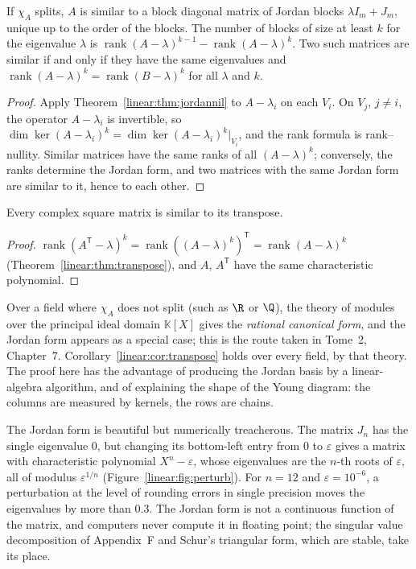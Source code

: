 \begin{corollary}\label{linear:cor:jordan}
If $\chi_A$ splits, $A$ is similar to a block diagonal matrix of Jordan blocks $\lambda I_m+J_m$, unique up to the order of
the blocks. The number of blocks of size at least $k$ for the eigenvalue $\lambda$ is
$\operatorname{rank}(A-\lambda)^{k-1}-\operatorname{rank}(A-\lambda)^k$. Two such matrices are similar if and only if
they have the same eigenvalues and $\operatorname{rank}(A-\lambda)^k=\operatorname{rank}(B-\lambda)^k$ for all $\lambda$ and $k$.
\end{corollary}
\begin{proof}
Apply Theorem~\ref{linear:thm:jordannil} to $A-\lambda_i$ on each $V_i$. On $V_j$, $j\ne i$, the operator $A-\lambda_i$ is invertible, so
$\dim\ker(A-\lambda_i)^k=\dim\ker(A-\lambda_i)^k|_{V_i}$, and the rank formula is rank--nullity. Similar matrices have the same
ranks of all $(A-\lambda)^k$; conversely, the ranks determine the Jordan form, and two matrices with the same Jordan form
are similar to it, hence to each other.
\end{proof}

\begin{corollary}\label{linear:cor:transpose}
Every complex square matrix is similar to its transpose.
\end{corollary}
\begin{proof}
$\operatorname{rank}(A^{\mathsf T}-\lambda)^k=\operatorname{rank}((A-\lambda)^k)^{\mathsf T}=\operatorname{rank}(A-\lambda)^k$
(Theorem~\ref{linear:thm:transpose}), and $A$, $A^{\mathsf T}$ have the same characteristic polynomial.
\end{proof}

\begin{remark}
Over a field where $\chi_A$ does not split (such as $\R$ or $\Q$), the theory of modules over the principal ideal
domain $\mathbb K[X]$ gives the \emph{rational canonical form}, and the Jordan form appears as a special case; this is
the route taken in Tome~2, Chapter~7. Corollary~\ref{linear:cor:transpose} holds over every field, by that theory. The proof here
has the advantage of producing the Jordan basis by a linear-algebra algorithm, and of explaining the shape of the Young
diagram: the columns are measured by kernels, the rows are chains.
\end{remark}

The Jordan form is beautiful but numerically treacherous. The matrix $J_n$ has the single eigenvalue $0$, but changing its
bottom-left entry from $0$ to $\varepsilon$ gives a matrix with characteristic polynomial $X^n-\varepsilon$, whose eigenvalues
are the $n$-th roots of $\varepsilon$, all of modulus $\varepsilon^{1/n}$ (Figure~\ref{linear:fig:perturb}). For $n=12$ and
$\varepsilon=10^{-6}$, a perturbation at the level of rounding errors in single precision moves the eigenvalues by more than $0.3$.
The Jordan form is not a continuous function of the matrix, and computers never compute it in floating point; the
singular value decomposition of Appendix~F and Schur's triangular form, which are stable, take its place.

